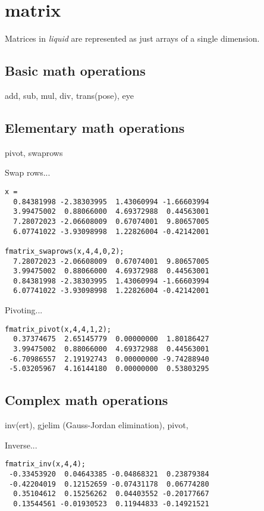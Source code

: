 % 
%
\section{matrix}
\label{module:matrix}
Matrices in {\it liquid} are represented as just arrays of a single dimension.

\subsection{Basic math operations}
\label{module:matrix:math}
add, sub, mul, div, trans(pose), eye

\subsection{Elementary math operations}
\label{module:matrix:elementary}
pivot, swaprows

Swap rows...
\begin{verbatim}
x = 
  0.84381998 -2.38303995  1.43060994 -1.66603994
  3.99475002  0.88066000  4.69372988  0.44563001
  7.28072023 -2.06608009  0.67074001  9.80657005
  6.07741022 -3.93098998  1.22826004 -0.42142001

fmatrix_swaprows(x,4,4,0,2);
  7.28072023 -2.06608009  0.67074001  9.80657005
  3.99475002  0.88066000  4.69372988  0.44563001
  0.84381998 -2.38303995  1.43060994 -1.66603994
  6.07741022 -3.93098998  1.22826004 -0.42142001
\end{verbatim}

Pivoting...
\begin{verbatim}
fmatrix_pivot(x,4,4,1,2);
  0.37374675  2.65145779  0.00000000  1.80186427
  3.99475002  0.88066000  4.69372988  0.44563001
 -6.70986557  2.19192743  0.00000000 -9.74288940
 -5.03205967  4.16144180  0.00000000  0.53803295
\end{verbatim}

\subsection{Complex math operations}
\label{module:matrix:complex}
inv(ert), gjelim (Gauss-Jordan elimination), pivot,

Inverse...
\begin{verbatim}
fmatrix_inv(x,4,4);
 -0.33453920  0.04643385 -0.04868321  0.23879384
 -0.42204019  0.12152659 -0.07431178  0.06774280
  0.35104612  0.15256262  0.04403552 -0.20177667
  0.13544561 -0.01930523  0.11944833 -0.14921521
\end{verbatim}

